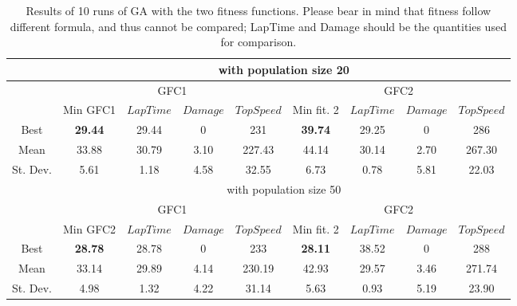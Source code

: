 \documentclass[conference]{IEEEtran}
\begin{document}
\begin{table}[ht]
	\centering
	{\scriptsize
		\caption{ Results of 10 runs of GA with the two fitness
			functions. Please bear in mind that fitness follow different
			formula, and thus cannot be compared; LapTime and Damage
			should be the quantities used for comparison. }
		{
			\begin{tabular}{|c||c|c|c|c||c|c|c|c|}
				\hline
				&\multicolumn{8}{c||}{ with population size 20}\\ %
				
				\hline
				&\multicolumn{4}{c||}{GFC1}&\multicolumn{4}{c|}{GFC2}\\
				\cline{2-9}
				& Min GFC1 & $LapTime$ & $Damage$ & $TopSpeed$& Min fit. 2& $LapTime$ & $Damage$ & $TopSpeed$\\
				\hline
				
				
				Best &\textbf{29.44}& 29.44& 0&231&\textbf{39.74} & 29.25& 0& 286\\
				
				
				
				
				
				
				
				\hline
				Mean &33.88 &30.79 &3.10&227.43&   44.14&  30.14 &   2.70&267.30\\ 
				St. Dev.&5.61&1.18&4.58&32.55&6.73&0.78 &5.81  & 22.03\\
				\hline
				\hline
				&\multicolumn{8}{c||}{ with population size 50}\\
				\hline
				&\multicolumn{4}{c||}{GFC1}&\multicolumn{4}{c|}{GFC2}\\
				\cline{2-9}
				& Min GFC2 & $LapTime$ & $Damage$ & $TopSpeed$& Min fit. 2& $LapTime$ & $Damage$ & $TopSpeed$\\
				\hline
				Best &\textbf{28.78}& 28.78& 0&233&\textbf{28.11} & 38.52& 0& 288\\
				\hline
				Mean &33.14 &29.89 &4.14&230.19&   42.93&  29.57 &   3.46&271.74\\ 
				St. Dev.&4.98&1.32&4.22&31.14&5.63&0.93 &5.19  & 23.90\\
				\hline
				

\end{tabular}}}
\end{table}
\end{document}
